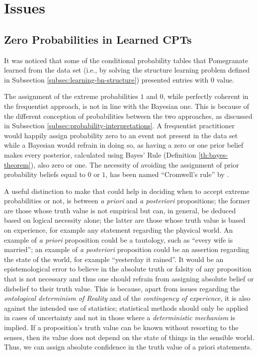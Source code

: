 \section{Issues} \label{sec:issues}

\subsection{Zero Probabilities in Learned CPTs}
It was noticed that some of the conditional probability tables that Pomegranate learned from the data set (i.e., by solving the structure learning problem defined in Subsection \ref{subsec:learning-bn-structure}) presented entries with $0$ value.

The assignment of the extreme probabilities $1$ and $0$, while perfectly coherent in the frequentist approach, is not in line with the Bayesian one.
This is because of the different conception of probabilities between the two approaches, as discussed in Subsection \ref{subsec:probability-interpretations}.
A frequentist practitioner would happily assign probability zero to an event not present in the data set while a Bayesian would refrain in doing so, as having a zero or one prior belief makes every posterior, calculated using Bayes' Rule (Definition \ref{th:bayes-theorem}), also zero or one.
The necessity of avoiding the assignment of prior probability beliefs equal to $0$ or $1$, has been named \enquote{Cromwell's rule} by \citet{Jackman2009}.

A useful distinction to make that could help in deciding when to accept extreme probabilities or not, is between \textit{a priori} and \textit{a posteriori} propositions; the former are those whose truth value is not empirical but can, in general, be deduced based on logical necessity alone; the latter are those whose truth value is based on experience, for example any statement regarding the physical world.
An example of \textit{a priori} proposition could be a tautology, such as \enquote{every wife is married}; an example of \textit{a posteriori} proposition could be an assertion regarding the state of the world, for example \enquote{yesterday it rained}.
It would be an epistemological error to believe in the absolute truth or falsity of any proposition that is not necessary and thus one should refrain from assigning absolute belief or disbelief to their truth value.
This is because, apart from issues regarding the \textit{ontological determinism of Reality} and of the \textit{contingency of experience}, it is also against the intended use of statistics; statistical methods should only be applied in cases of uncertainty and not in those where a \textit{deterministic mechanism} is implied.
If a proposition's truth value can be known without resorting to the senses, then its value does not depend on the state of things in the sensible world.
Thus, we can assign absolute confidence in the truth value of a priori statements.


